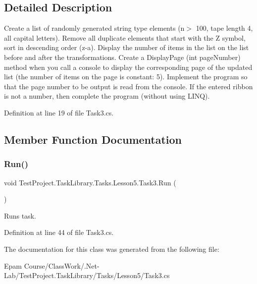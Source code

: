 \subsection{Detailed Description}
Create a list of randomly generated string type elements (n$>$ 100, tape length 4, all capital letters). Remove all duplicate elements that start with the \textquotesingle{}Z\textquotesingle{} symbol, sort in descending order (z-\/a). Display the number of items in the list on the list before and after the transformations. Create a Display\+Page (int page\+Number) method when you call a console to display the corresponding page of the updated list (the number of items on the page is constant\+: 5). Implement the program so that the page number to be output is read from the console. If the entered ribbon is not a number, then complete the program (without using L\+I\+NQ). 



Definition at line 19 of file Task3.\+cs.



\subsection{Member Function Documentation}
\mbox{\label{class_test_project_1_1_task_library_1_1_tasks_1_1_lesson5_1_1_task3_a8e5d629307dea4dd19406e51b204e7d6}} 
\subsubsection{\texorpdfstring{Run()}{Run()}}
{\footnotesize\ttfamily void Test\+Project.\+Task\+Library.\+Tasks.\+Lesson5.\+Task3.\+Run (\begin{DoxyParamCaption}{ }\end{DoxyParamCaption})}



Runs task. 



Definition at line 44 of file Task3.\+cs.



The documentation for this class was generated from the following file\+:\begin{DoxyCompactItemize}
\item 
Epam Course/\+Class\+Work/.\+Net-\/\+Lab/\+Test\+Project.\+Task\+Library/\+Tasks/\+Lesson5/Task3.\+cs\end{DoxyCompactItemize}
